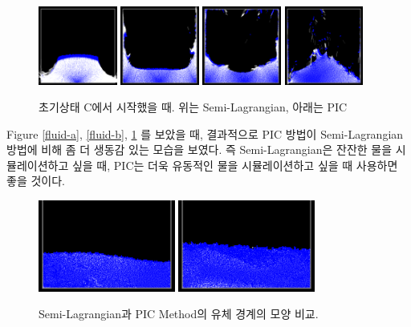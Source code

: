 \documentclass[12pt, A4]{article}
\begin{document}
\begin{figure}[h!]
\includegraphics[width=0.23\textwidth]{pic-state-c/img1}
\includegraphics[width=0.23\textwidth]{pic-state-c/img2}
\includegraphics[width=0.23\textwidth]{pic-state-c/img3}
\includegraphics[width=0.23\textwidth]{pic-state-c/img4}
  \caption{초기상태 C에서 시작했을 때. 위는 Semi-Lagrangian, 아래는 PIC}
  \label{fluid-c}
\end{figure}

Figure \ref{fluid-a}, \ref{fluid-b}, \ref{fluid-c} 를 보았을 때, 결과적으로 PIC 방법이 Semi-Lagrangian 방법에 비해 좀 더 생동감 있는 모습을 보였다. 즉 Semi-Lagrangian은 잔잔한 물을 시뮬레이션하고 싶을 때, PIC는 더욱 유동적인 물을 시뮬레이션하고 싶을 때 사용하면 좋을 것이다.

\begin{figure}[h]
  \centering
\includegraphics[width=0.40\textwidth]{pic-perturb-1}
\includegraphics[width=0.40\textwidth]{semilag-perturb-4}
  \caption{Semi-Lagrangian과 PIC Method의 유체 경계의 모양 비교.}
  \label{fluid-boundary}
\end{figure}
\end{document}
